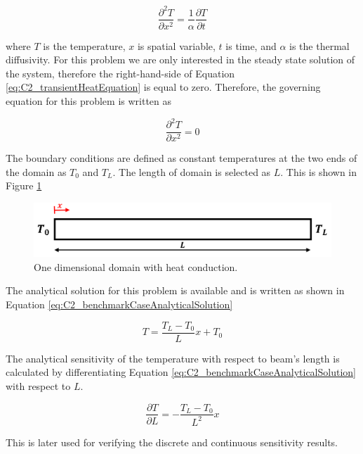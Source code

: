 \begin{equation}\label{eq:C2_transientHeatEquation}
	\frac{\partial^2 T}{\partial x^2} = \frac{1}{\alpha} \frac{\partial T}{\partial t}
\end{equation}

where $T$ is the temperature, $x$ is spatial variable, $t$ is time, and $\alpha$ is the thermal diffusivity. For this problem we are only interested in the steady state solution of the system, therefore the right-hand-side of Equation \eqref{eq:C2_transientHeatEquation} is equal to zero. Therefore, the governing equation for this problem is written as

\begin{equation}\label{eq:C2_laplaceEquation}
	\frac{\partial^2 T}{\partial x^2} = 0
\end{equation}

The boundary conditions are defined as constant temperatures at the two ends of the domain as $T_0$ and $T_L$. The length of domain is selected as $L$. This is shown in Figure \ref{fig:C2_benchmarkCase}

\begin{figure}[h]
	\centering
	\includegraphics[width=14.00cm]{Chapter_2/figure/benchmark_case.png}
	\caption{One dimensional domain with heat conduction.}
	\label{fig:C2_benchmarkCase}
\end{figure}

The analytical solution for this problem is available and is written as shown in Equation \eqref{eq:C2_benchmarkCaseAnalyticalSolution}

\begin{equation}\label{eq:C2_benchmarkCaseAnalyticalSolution}
	T = \frac{T_L - T_0}{L} x + T_0
\end{equation}

The analytical sensitivity of the temperature with respect to beam's length is calculated by differentiating Equation \eqref{eq:C2_benchmarkCaseAnalyticalSolution} with respect to $L$.

\begin{equation}
	\frac{\partial T}{\partial L} = -\frac{T_L - T_0}{L^2} x
\end{equation}

This is later used for verifying the discrete and continuous sensitivity results.

